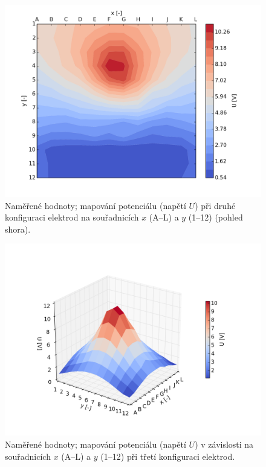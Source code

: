\documentclass[english]{article}
\begin{document}
	\begin{figure}[h!]
	\begin{center}
	    \vspace*{-0.5cm}
		\includegraphics[width=0.8\linewidth]{../gnuplot/konfigurace_2_map.png}
	    \vspace*{-1cm}
		\caption{Naměřené hodnoty; mapování potenciálu (napětí $U$) při druhé konfiguraci elektrod na souřadnicích $x$ (A--L) a $y$ (1--12) (pohled shora).} 
		\label{fig:g_konf2_mapa}
	\end{center}
	\end{figure}

	\begin{figure}[h!]
	\begin{center}
	    \vspace*{-1.5cm}
		\includegraphics[width=\linewidth]{../gnuplot/konfigurace_3.png}
	    \vspace*{-2cm}
		\caption{Naměřené hodnoty; mapování potenciálu (napětí $U$) v závislosti na souřadnicích $x$ (A--L) a $y$ (1--12) při třetí konfiguraci elektrod.} 
		\label{fig:g_konf3}
	\end{center}
	\end{figure}			
\end{document}
